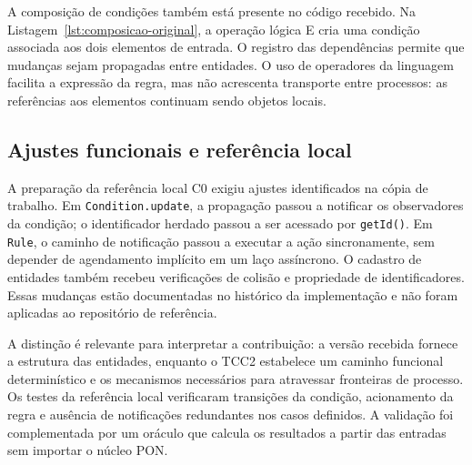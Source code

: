 \begin{sourcecode}[htbp]
\caption{Trecho original: atualização de valor em \texttt{Attribute}.}
\label{lst:atributo-original}

\end{sourcecode}

A composição de condições também está presente no código recebido. Na Listagem~\ref{lst:composicao-original}, a operação lógica E cria uma condição associada aos dois elementos de entrada. O registro das dependências permite que mudanças sejam propagadas entre entidades. O uso de operadores da linguagem facilita a expressão da regra, mas não acrescenta transporte entre processos: as referências aos elementos continuam sendo objetos locais.

\begin{sourcecode}[htbp]
\caption{Trecho original: composição de condições pela operação lógica E.}
\label{lst:composicao-original}

\end{sourcecode}

\subsection{Ajustes funcionais e referência local}

A preparação da referência local C0 exigiu ajustes identificados na cópia de trabalho. Em \texttt{Condition.update}, a propagação passou a notificar os observadores da condição; o identificador herdado passou a ser acessado por \texttt{getId()}. Em \texttt{Rule}, o caminho de notificação passou a executar a ação sincronamente, sem depender de agendamento implícito em um laço assíncrono. O cadastro de entidades também recebeu verificações de colisão e propriedade de identificadores. Essas mudanças estão documentadas no histórico da implementação e não foram aplicadas ao repositório de referência.

A distinção é relevante para interpretar a contribuição: a versão recebida fornece a estrutura das entidades, enquanto o TCC2 estabelece um caminho funcional determinístico e os mecanismos necessários para atravessar fronteiras de processo. Os testes da referência local verificaram transições da condição, acionamento da regra e ausência de notificações redundantes nos casos definidos. A validação foi complementada por um oráculo que calcula os resultados a partir das entradas sem importar o núcleo PON.

